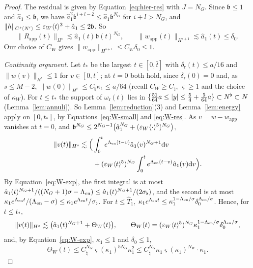 \begin{proof}
The residual is given by Equation~\eqref{eq:hier-res} with $J=N_G$. Since
$\mathfrak b\le1$ and $\hat a_1\le\mathfrak b$, we have
$\hat a_1^2\mathfrak b^{i+l-2}\le\hat a_1\mathfrak b^{N_G}$ for $i+l>N_G$, and
$\|h\|_{C^s(N')}\le\varepsilon_W\langle t\rangle^3+\hat a_1\le2\mathfrak b$. So
\begin{equation}
\label{eq:W-res}
\|R_{\mathrm{app}}(t)\|_{H^s}\lesssim\hat a_1(t)\mathfrak b(t)^{N_G},\qquad
\|w_{\mathrm{app}}(t)\|_{H^{s+1}}\lesssim\hat a_1(t)\le\delta_0 .
\end{equation}
Our choice of $C_W$ gives $\|w_{\mathrm{app}}\|_{H^{s+1}}\le C_W\delta_0\le1$.

\emph{Continuity argument.} Let $t_*$ be the largest $t\in[0,\bar t]$ with
$\delta_{\mathrm r}(t)\le a/16$ and $\|w(v)\|_{H^s}\le1$ for $v\in[0,t]$; at $t=0$
both hold, since $\delta_{\mathrm r}(0)=0$ and, as $s\le M-2$,
$\|w(0)\|_{H^s}\le C_\natural\kappa_1\le a/64$ (recall $C_W\ge C_\natural$, $\varsigma\ge1$
and the choice of $\kappa_W$). For $t\le t_*$ the
support of $\omega_{\mathrm r}(t)$ lies in
$\{\frac{51}{64}a\le|y|\le\frac54+\frac5{64}a\}\subset N^{\flat}\subset N$
(Lemma~\ref{lem:annuli}). So
Lemma~\ref{lem:reduction}\textup{(3)} and Lemma~\ref{lem:energy} apply on $[0,t_*]$,
by Equations~\eqref{eq:W-small} and \eqref{eq:W-res}. As $v=w-w_{\mathrm{app}}$
vanishes at $t=0$, and
$\mathfrak b^{N_G}\le2^{N_G-1}\big(\hat a_1^{N_G}+(\varepsilon_W\langle \cdot\rangle^{5})^{N_G}\big)$,
\[
\begin{aligned}
\|v(t)\|_{H^s}\lesssim\Big(&\int_0^te^{\Lambda_{\mathrm{en}}(t-v)}\hat a_1(v)^{N_G+1}\dd v\\
&+(\varepsilon_W\langle t\rangle^{5})^{N_G}\int_0^te^{\Lambda_{\mathrm{en}}(t-v)}\hat a_1(v)\dd v\Big).
\end{aligned}
\]
By Equation~\eqref{eq:W-exp}, the first integral is at most
$\hat a_1(t)^{N_G+1}/((N_G+1)\sigma-\Lambda_{\mathrm{en}})\le\hat a_1(t)^{N_G+1}/(2\sigma_\flat)$, and the second is
at most $\kappa_1e^{\Lambda_{\mathrm{en}} t}/(\Lambda_{\mathrm{en}}-\sigma)\le\kappa_1e^{\Lambda_{\mathrm{en}} t}/\sigma_\flat$. For $t\le\hat T_1$,
$\kappa_1e^{\Lambda_{\mathrm{en}} t}\le\kappa_1^{1-\Lambda_{\mathrm{en}}/\sigma}\delta_0^{\Lambda_{\mathrm{en}}/\sigma}$. Hence, for $t\le t_*$,
\begin{equation}
\label{eq:W-v}
\|v(t)\|_{H^s}\lesssim\big(\hat a_1(t)^{N_G+1}+\Theta_W(t)\big),\qquad
\Theta_W(t)=(\varepsilon_W\langle t\rangle^{5})^{N_G}\kappa_1^{1-\Lambda_{\mathrm{en}}/\sigma}\delta_0^{\Lambda_{\mathrm{en}}/\sigma},
\end{equation}
and, by Equation~\eqref{eq:W-exp}, $\kappa_1\le1$ and $\delta_0\le1$,
\begin{equation}
\label{eq:W-theta}
\Theta_W(t)\le C_\natural^{N_G}\varsigma(\kappa_1)^{5N_G}\kappa_1^2\le C_\natural^{N_G}\kappa_1\varsigma(\kappa_1)^{N_W}\cdot\kappa_1 .
\end{equation}


\end{proof}
